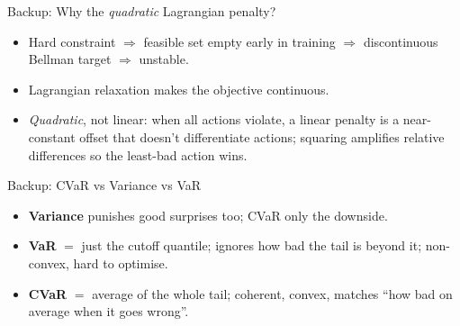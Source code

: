 \documentclass[aspectratio=169,11pt]{beamer}
\begin{document}
{\begin{frame}{Backup: Why the \emph{quadratic} Lagrangian penalty?}
  \begin{itemize}
    \item Hard constraint $\Rightarrow$ feasible set empty early in training
          $\Rightarrow$ discontinuous Bellman target $\Rightarrow$ unstable.
    \item Lagrangian relaxation makes the objective continuous.
    \item \emph{Quadratic}, not linear: when all actions violate, a linear
          penalty is a near-constant offset that doesn't differentiate
          actions; squaring amplifies relative differences so the
          least-bad action wins.
  \end{itemize}
\end{frame}

\begin{frame}{Backup: CVaR vs Variance vs VaR}
  \begin{itemize}
    \item \textbf{Variance} punishes good surprises too; CVaR only the downside.
    \item \textbf{VaR} $=$ just the cutoff quantile; ignores how bad the tail
          is beyond it; non-convex, hard to optimise.
    \item \textbf{CVaR} $=$ average of the whole tail; coherent, convex,
          matches ``how bad on average when it goes wrong''.
  \end{itemize}
\end{frame}
}
\end{document}
